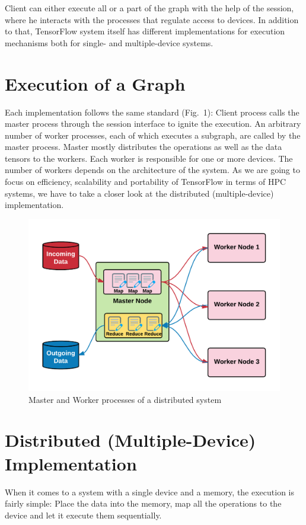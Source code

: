 \documentclass[ieeetran]{article}
\begin{document}
Client can either execute all or a part of the graph with the help of the session, where he interacts with the processes that regulate access to devices. In addition to that, TensorFlow system itself has different implementations for execution mechanisms both for single- and multiple-device systems.  
\section{Execution of a Graph} %
\label{sec:execution_of_a_graph}
Each implementation follows the same standard (Fig.\ 1): Client process calls the master process through the session interface to ignite the execution. An arbitrary number of worker processes, each of which executes a subgraph, are called by the master process. Master mostly distributes the operations as well as the data tensors to the workers. Each worker is responsible for one or more devices. The number of workers depends on the architecture of the system. As we are going to focus on efficiency, scalability and portability of TensorFlow in terms of HPC systems, we have to take a closer look at the distributed (multiple-device) implementation.

\begin{figure}[h!]
  \centering
  \includegraphics[width=0.5\linewidth]{executionofgraph}
  \caption[placeholder]{Master and Worker processes of a distributed system\footnotemark} 
  \label{fig:executionofgraph}
\end{figure}
\section{Distributed (Multiple-Device) Implementation} %
\label{sec:multiple_device_execution_of_a_graph}
When it comes to a system with a single device and a memory, the execution is fairly simple: Place the data into the memory, map all the operations to the device and let it execute them sequentially.
\end{document}
